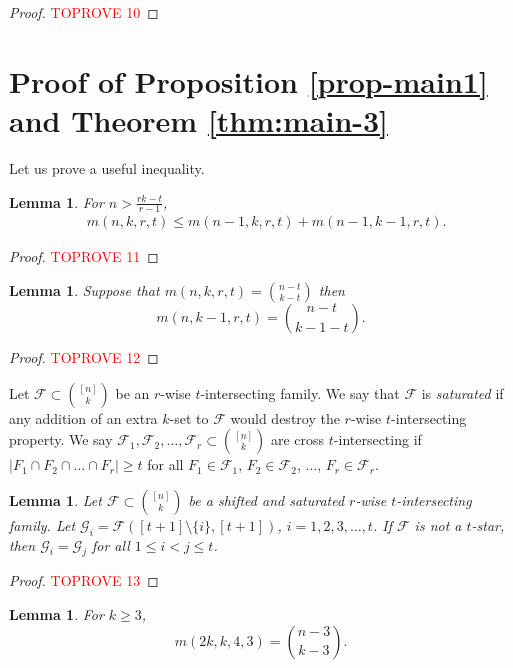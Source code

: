 \documentclass[11pt,a4paper]{article}
\newtheorem{lem}[thm]{Lemma}
\newtheorem{false statement}{False statement}
\theoremstyle{definition}
\def\hf{\mathcal{F}}
\def\hg{\mathcal{G}}
\begin{document}
\begin{proof}\textcolor{red}{TOPROVE 10}\end{proof}


\section{Proof of Proposition \ref{prop-main1} and Theorem \ref{thm:main-3}}




Let us prove a useful inequality.

\begin{lem}
For $n> \frac{rk-t}{r-1}$,
\begin{align}\label{ineq-2.1}
& m(n,k,r,t) \leq m(n-1,k,r,t) +m(n-1,k-1,r,t).
\end{align}
\end{lem}

\begin{proof}\textcolor{red}{TOPROVE 11}\end{proof}


\begin{lem}\label{lem-6.2}
Suppose that $m(n,k,r,t)=\binom{n-t}{k-t}$ then
\[
m(n,k-1,r,t) =\binom{n-t}{k-1-t}.
\]
\end{lem}

\begin{proof}\textcolor{red}{TOPROVE 12}\end{proof}

Let $\hf\subset \binom{[n]}{k}$ be an $r$-wise $t$-intersecting family.
We say that $\hf$ is {\it saturated} if any addition of an extra $k$-set to $\hf$ would destroy the $r$-wise $t$-intersecting property. We say $\hf_1,\hf_2,\ldots,\hf_r\subset \binom{[n]}{k}$ are {cross $t$-intersecting} if $|F_1\cap F_2\cap\ldots \cap F_r|\geq t$ for all $F_1\in \hf_1$, $F_2\in \hf_2$, $\ldots$, $F_r\in \hf_r$.

\begin{lem}\label{lem-6.4}
Let $\hf\subset \binom{[n]}{k}$ be a shifted and saturated $r$-wise $t$-intersecting family. Let $\hg_i=\hf([t+1]\setminus \{i\},[t+1])$, $i=1,2,3,\ldots,t$. If $\hf$ is not a $t$-star, then $\hg_i=\hg_j$ for all $1\leq i<j\leq t$.
\end{lem}

\begin{proof}\textcolor{red}{TOPROVE 13}\end{proof}

\begin{lem}\label{lem-6.5}
For $k\geq 3$,
\[
m(2k,k,4,3)=\binom{n-3}{k-3}.
\]
\end{lem}
\end{document}
